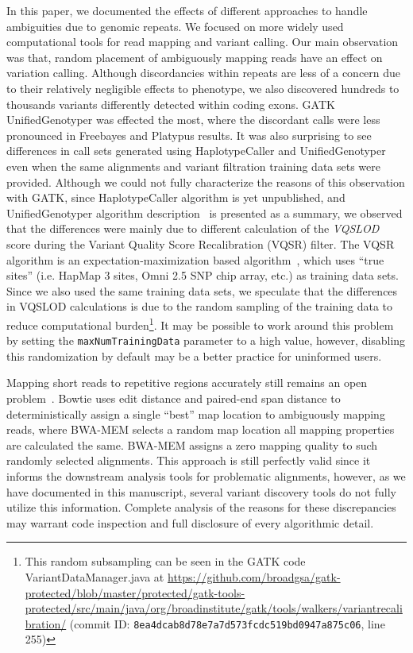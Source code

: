 \documentclass[10pt,a4paper]{article}
\begin{document}
In this paper, we documented the effects of different approaches to handle ambiguities due to genomic repeats. We focused on more widely used computational tools for read mapping and variant calling. Our main observation was that, random placement of ambiguously mapping reads have an effect on variation calling. Although discordancies within repeats are less of a concern due to their relatively negligible 
effects to phenotype, we also discovered hundreds to thousands variants differently detected within coding exons. GATK UnifiedGenotyper was effected the most, where the discordant calls were less pronounced in Freebayes and Platypus results. It was also surprising to see differences in call sets generated using HaplotypeCaller and UnifiedGenotyper even when the same alignments and variant filtration training data sets were provided. Although we could not fully characterize the reasons
of this observation with GATK, since HaplotypeCaller algorithm is yet unpublished, and UnifiedGenotyper algorithm description~\cite{DePristo2011} is presented as a summary, we observed that the differences were
mainly due to different calculation of the {\it VQSLOD} score during the Variant Quality Score Recalibration (VQSR) filter. The VQSR algorithm is an expectation-maximization based algorithm~\cite{DePristo2011},
which uses ``true sites'' (i.e. HapMap 3 sites, Omni 2.5 SNP chip array, etc.) as training data sets. Since we also used the same training data sets, 
we speculate that the differences in VQSLOD calculations is due to the random sampling of the training data
to reduce computational burden\footnote{This random subsampling can be seen in the GATK code VariantDataManager.java at \url{https://github.com/broadgsa/gatk-protected/blob/master/protected/gatk-tools-protected/src/main/java/org/broadinstitute/gatk/tools/walkers/variantrecalibration/} (commit ID: {\tt 8ea4dcab8d78e7a7d573fcdc519bd0947a875c06}, line 255)}. It may be possible to work around this problem by setting the {\tt maxNumTrainingData} parameter to a high value, however, disabling this randomization
by default may be a better practice for uninformed users.

Mapping short reads to repetitive regions accurately still remains an open problem~\cite{Treangen2012}. Bowtie uses %
edit distance and paired-end span distance 
to deterministically assign a single ``best'' map location to ambiguously mapping reads, where BWA-MEM selects a random map location all mapping properties are calculated the same. BWA-MEM assigns a zero mapping quality
to such randomly selected alignments. This approach is still perfectly valid since it informs the downstream analysis tools for problematic alignments, however, as we have documented in this manuscript, 
several variant discovery tools do not fully utilize this information. Complete analysis of the reasons for these discrepancies may warrant code inspection and full disclosure of every algorithmic detail.
\end{document}
